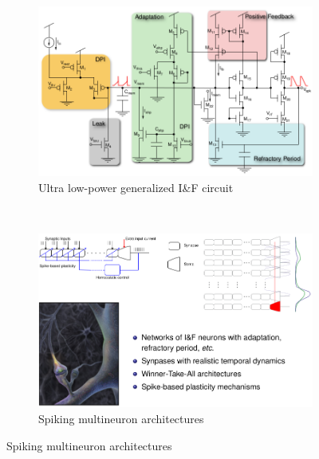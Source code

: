\documentclass[a4paper, 12pt]{article}
\begin{document}
\begin{figure}[H]
	\centering
	\begin{subfigure}[b]{0.5\textwidth}
		\centering
		\includegraphics[width=\textwidth]{IanF-circuit.png}
		\caption{Ultra low-power generalized I\&F circuit}
	\end{subfigure}%
	~
	\begin{subfigure}[b]{0.5\textwidth}
		\centering
		\includegraphics[width=\textwidth]{multineuron-circuit.png}
		\caption{Spiking multineuron architectures}
	\end{subfigure}
\end{figure}
\end{document}
